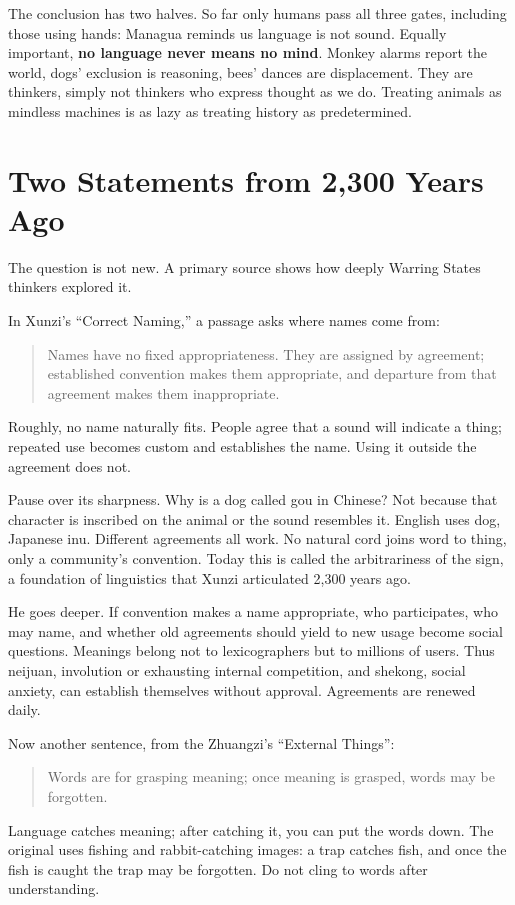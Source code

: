 The conclusion has two halves. So far only humans pass all three gates, including those using hands: Managua reminds us language is not sound. Equally important, \textbf{no language never means no mind}. Monkey alarms report the world, dogs' exclusion is reasoning, bees' dances are displacement. They are thinkers, simply not thinkers who express thought as we do. Treating animals as mindless machines is as lazy as treating history as predetermined.

\section{Two Statements from 2,300 Years Ago}
The question is not new. A primary source shows how deeply Warring States thinkers explored it.

In Xunzi's ``Correct Naming,'' a passage asks where names come from:

\begin{quote}
Names have no fixed appropriateness. They are assigned by agreement; established convention makes them appropriate, and departure from that agreement makes them inappropriate.
\end{quote}
Roughly, no name naturally fits. People agree that a sound will indicate a thing; repeated use becomes custom and establishes the name. Using it outside the agreement does not.

Pause over its sharpness. Why is a dog called gou in Chinese? Not because that character is inscribed on the animal or the sound resembles it. English uses dog, Japanese inu. Different agreements all work. No natural cord joins word to thing, only a community's convention. Today this is called the arbitrariness of the sign, a foundation of linguistics that Xunzi articulated 2,300 years ago.

He goes deeper. If convention makes a name appropriate, who participates, who may name, and whether old agreements should yield to new usage become social questions. Meanings belong not to lexicographers but to millions of users. Thus neijuan, involution or exhausting internal competition, and shekong, social anxiety, can establish themselves without approval. Agreements are renewed daily.

Now another sentence, from the Zhuangzi's ``External Things'':

\begin{quote}
Words are for grasping meaning; once meaning is grasped, words may be forgotten.
\end{quote}
Language catches meaning; after catching it, you can put the words down. The original uses fishing and rabbit-catching images: a trap catches fish, and once the fish is caught the trap may be forgotten. Do not cling to words after understanding.

